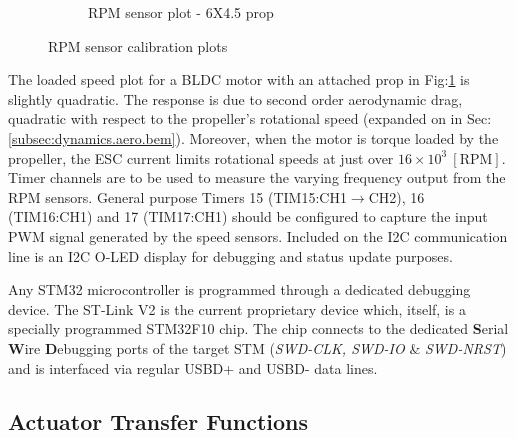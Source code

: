 \begin{figure}[htbp]
\begin{subfigure}{0.5\textwidth}
\caption{RPM sensor plot - 6X4.5 prop}
\label{fig:rpm-sensor-prop}
\end{subfigure}
\vspace{-4pt}
\caption{RPM sensor calibration plots}
\label{fig:rpm-sensor}
\vspace{-14pt}
\end{figure}
\par
The loaded speed plot for a BLDC motor with an attached prop in Fig:\ref{fig:rpm-sensor-prop} is slightly quadratic. The response is due to second order aerodynamic drag, quadratic with respect to the propeller's rotational speed (expanded on in Sec:\ref{subsec:dynamics.aero.bem}). Moreover, when the motor is torque loaded by the propeller, the ESC current limits rotational speeds at just over $16\times 10^3~[\text{RPM}]$. Timer channels are to be used to measure the varying frequency output from the RPM sensors. General purpose Timers 15 (TIM15:CH1$\rightarrow$CH2), 16 (TIM16:CH1) and 17 (TIM17:CH1) should be configured to capture the input PWM signal generated by the speed sensors. Included on the I2C communication line is an I2C O-LED display for debugging and status update purposes.
\par
Any STM32 microcontroller is programmed through a dedicated debugging device. The ST-Link V2\cite{st-link} is the current proprietary device which, itself, is a specially programmed STM32F10 chip. The chip connects to the dedicated \textbf{S}erial \textbf{W}ire \textbf{D}ebugging ports of the target STM (\emph{SWD-CLK, SWD-IO} \& \emph{SWD-NRST}) and is interfaced via regular USBD+ and USBD- data lines. 
\subsection{Actuator Transfer Functions}
\label{subsec:proto.design.transfer}
